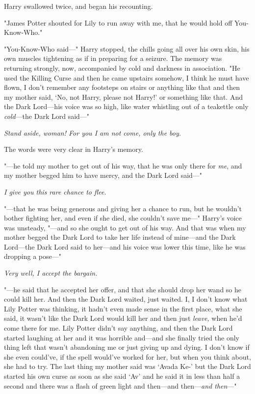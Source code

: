 Harry swallowed twice, and began his recounting.

"James Potter shouted for Lily to run away with me, that he would hold off
You-Know-Who."

"You-Know-Who said—" Harry stopped, the chills going all over his own skin,
his own muscles tightening as if in preparing for a seizure. The memory was
returning strongly, now, accompanied by cold and darkness in association. "He
used{\el} the Killing Curse{\el} and then he came upstairs somehow, I
think he must have flown, I don't remember any footsteps on stairs or anything
like that{\el} and then my mother said, `No, not Harry, please not Harry!'
or something like that. And the Dark Lord—his voice was so high, like water
whistling out of a teakettle only \emph{cold}—the Dark Lord said—"

\emph{Stand aside, woman! For you I am not come, only the boy.}

The words were very clear in Harry's memory.

"—he told my mother to get out of his way, that he was only there for
\emph{me}, and my mother begged him to have mercy, and the Dark Lord said—"

\emph{I give you this rare chance to flee.}

"—that he was being generous and giving her a chance to run, but he wouldn't
bother fighting her, and even if she died, she couldn't save me—" Harry's
voice was unsteady, "—and so she ought to get out of his way. And that was
when my mother begged the Dark Lord to take her life instead of mine—and the
Dark Lord—the Dark Lord said to her—and his voice was lower this time, like
he was dropping a pose—"

\emph{Very well, I accept the bargain.}

"—he said that he accepted her offer, and that she should drop her wand so he
could kill her. And then the Dark Lord waited, just waited. I, I don't know
what Lily Potter was thinking, it hadn't even made sense in the first place,
what she said, it wasn't like the Dark Lord would kill her and then just
\emph{leave,} when he'd come there for me. Lily Potter didn't say anything, and
then the Dark Lord started laughing at her and it was horrible and—and she
finally tried the only thing left that wasn't abandoning me or just giving up
and dying. I don't know if she even could've, if the spell would've worked for
her, but when you think about, she had to try. The last thing my mother said
was `Avada Ke-' but the Dark Lord started his own curse as soon as she said
`Av' and he said it in less than half a second and there was a flash of green
light and then—and then—\emph{and then}—"


